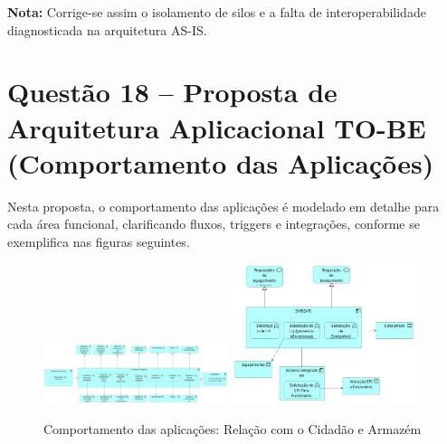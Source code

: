 \documentclass[12pt,a4paper,final]{article}
\begin{document}
    \textbf{Nota:} Corrige-se assim o isolamento de silos e a falta de interoperabilidade diagnosticada na arquitetura AS-IS.

    \section*{Questão 18 – Proposta de Arquitetura Aplicacional TO-BE (Comportamento das Aplicações)}

    Nesta proposta, o comportamento das aplicações é modelado em detalhe para cada área funcional, clarificando fluxos, triggers e integrações, conforme se exemplifica nas figuras seguintes.

    \begin{figure}[H]
        \centering
        \includegraphics[width=0.48\textwidth]{Q18 - Application Behavior - Citzen Relations Management.jpg}
        \includegraphics[width=0.48\textwidth]{Q18 - Application Behavior- Warehouse Management.jpg}
        \caption{Comportamento das aplicações: Relação com o Cidadão e Armazém}
        \label{fig:q18-behavior-cidadao-armazem}
    \end{figure}
\end{document}
